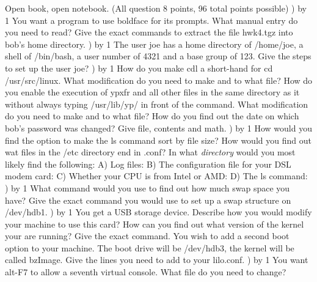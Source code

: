
\parindent=0in
\nopagenumbers
\newcount\quesno
{}
\def\ques{\number\quesno) \advance\quesno by 1}
\def\aspace{\vskip 1.5in}

Open book, open notebook. (All question 8 points, 96 total points possible)
\hfill\break
\ques
You want a program to use boldface for its prompts.
What manual entry do you need to read?
\vskip 0.8in
Give the exact commands to extract the file {\ltt{}hwk4.tgz}
into bob's home directory.
\vskip 0.4in
\ques
The user {\ltt{}joe} has  a home directory of {\ltt{}/home/joe},
a shell of {\ltt{}/bin/bash}, a user number of {\ltt{}4321}
and a base group of {\ltt{}123}.
Give the steps to set up the user {\ltt{}joe}?
\vskip 1.4in
\ques
How do you make {\ltt{}cdl} a short-hand for {\ltt{}cd /usr/src/linux}.
What modification do you need to make and to what file?
\vskip 0.8in
How do you enable the execution of {\ltt{}ypxfr} and all other files
in the same directory as it without always typing {\ltt{}/usr/lib/yp/}
in front of the command.
What modification do you need to make and to what file?
\vskip 0.8in
How do you find out the date on which bob's password was changed?
Give file, contents and math.
\vskip 1.4in
\vfill\eject
\ques
How would you find the option to make the {\ltt{}ls} command sort by file size?
\vskip 0.4in
How would you find out wat files in the {\ltt{}/etc} directory end in
{\ltt{}.conf}?
\vskip 0.4in
In what {\it directory} would you most likely find
the following:
\hfill\break
A) Log files:
\vskip 0.3in
B) The configuration file for your DSL modem card:
\vskip 0.3in
C) Whether your CPU is from Intel or AMD:
\vskip 0.3in
D) The {\ltt{}ls} command:
\vskip 0.3in
\ques
What command would you use to find out how much swap space you have?
\vskip 0.4in
Give the exact command you would use to set up a swap structure on
{\ltt{}/dev/hdb1}.
\vskip 0.4in
\ques
You get a USB storage device.
Describe how you would modify your machine to use this card?
\vskip 1.5in
How can you find out what version of the kernel your are running?
Give the exact command.
\vskip 0.4in
You wish to add a second boot option to your machine.
The boot drive will be {\ltt{}/dev/hdb3}, the kernel will
be called {\ltt{}bzImage}.
Give the lines you need to add to your {\ltt{}lilo.conf}.
\vskip 1.8in
\vfill\eject
\ques
You want alt-F7 to allow a seventh virtual console.
What file do you need to change?
